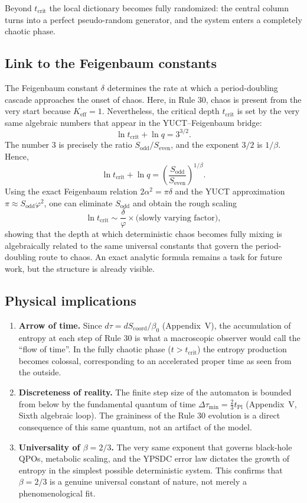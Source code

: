 \documentclass[11pt,a4paper]{article}
\begin{document}
	Beyond \(t_{\mathrm{crit}}\) the local dictionary becomes fully randomized: the central column turns into a perfect pseudo-random generator, and the system enters a completely chaotic phase.
	
	\subsection{Link to the Feigenbaum constants}
	\label{subsec:feigenbaum-link}
	
	The Feigenbaum constant \(\delta\) determines the rate at which a period-doubling cascade approaches the onset of chaos. Here, in Rule 30, chaos is present from the very start because \(K_{\mathrm{eff}}=1\). Nevertheless, the critical depth \(t_{\mathrm{crit}}\) is set by the very same algebraic numbers that appear in the YUCT–Feigenbaum bridge:
	\[
	\ln t_{\mathrm{crit}} + \ln q = 3^{3/2}.
	\]
	The number \(3\) is precisely the ratio \(S_{\mathrm{odd}}/S_{\mathrm{even}}\), and the exponent \(3/2\) is \(1/\beta\). Hence,
	\[
	\ln t_{\mathrm{crit}} + \ln q =
	\left(\frac{S_{\mathrm{odd}}}{S_{\mathrm{even}}}\right)^{\!1/\beta}.
	\]
	Using the exact Feigenbaum relation \(2\alpha^{2} = \pi\delta\) and the YUCT approximation \(\pi \approx S_{\mathrm{odd}}\varphi^{2}\), one can eliminate \(S_{\mathrm{odd}}\) and obtain the rough scaling
	\[
	\ln t_{\mathrm{crit}} \sim \frac{\delta}{\varphi} \times
	\bigl(\text{slowly varying factor}\bigr),
	\]
	showing that the depth at which deterministic chaos becomes fully mixing is algebraically related to the same universal constants that govern the period-doubling route to chaos. An exact analytic formula remains a task for future work, but the structure is already visible.
	
	\subsection{Physical implications}
	\label{subsec:implications}
	
	\begin{enumerate}
		\item \textbf{Arrow of time.} Since \(d\tau = dS_{\mathrm{coord}}/\beta_{0}\) (Appendix~V), the accumulation of entropy at each step of Rule 30 is what a macroscopic observer would call the “flow of time”. In the fully chaotic phase (\(t > t_{\mathrm{crit}}\)) the entropy production becomes colossal, corresponding to an accelerated proper time as seen from the outside.
		\item \textbf{Discreteness of reality.} The finite step size of the automaton is bounded from below by the fundamental quantum of time \(\Delta\tau_{\min} = \frac{2}{3}t_{\mathrm{Pl}}\) (Appendix~V, Sixth algebraic loop). The graininess of the Rule 30 evolution is a direct consequence of this same quantum, not an artifact of the model.
		\item \textbf{Universality of \(\beta=2/3\).} The very same exponent that governs black-hole QPOs, metabolic scaling, and the YPSDC error law dictates the growth of entropy in the simplest possible deterministic system. This confirms that \(\beta=2/3\) is a genuine universal constant of nature, not merely a phenomenological fit.
	\end{enumerate}
	
\end{document}
